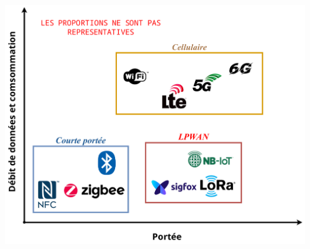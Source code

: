 \documentclass[../main.tex]{subfiles}
\begin{document}
\begin{frame}{}
  \includegraphics[width=0.9\linewidth]{figures/drawiopdf/lpwan_and_co}
\end{frame}
\end{document}
